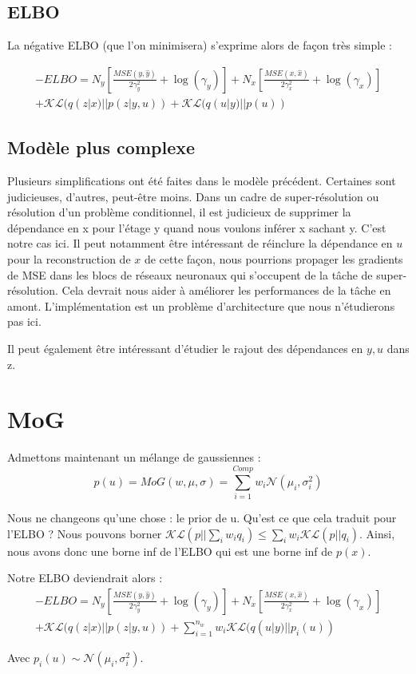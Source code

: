 \documentclass{article}
\begin{document}
\subsection{ELBO}
La négative ELBO (que l'on minimisera) s'exprime alors de façon très simple :

\begin{multline}
    - ELBO = N_y\left[\frac{MSE(y,\hat{y})}{2\gamma_y^2} + \log(\gamma_y)\right] + N_x\left[\frac{MSE(x,\hat{x})}{2\gamma_x^2} + \log(\gamma_x)\right]\\ + \mathcal{KL}(q(z|x)||p(z|y,u)) + \mathcal{KL}(q(u|y)||p(u)) 
\end{multline}

\subsection{Modèle plus complexe}
Plusieurs simplifications ont été faites dans le modèle précédent. Certaines sont judicieuses, d'autres, peut-être moins. Dans un cadre de super-résolution ou résolution d'un problème conditionnel, il est judicieux de supprimer la dépendance en x pour l'étage y quand nous voulons inférer x sachant y. C'est notre cas ici. Il peut notamment être intéressant de réinclure la dépendance en $u$ pour la reconstruction de $x$ de cette façon, nous pourrions propager les gradients de MSE dans les blocs de réseaux neuronaux qui s'occupent de la tâche de super-résolution. Cela devrait nous aider à améliorer les performances de la tâche en amont. L'implémentation est un problème d'architecture que nous n'étudierons pas ici.

Il peut également être intéressant d'étudier le rajout des dépendances en $y,u$ dans z.

\section{MoG}

Admettons maintenant un mélange de gaussiennes :
\begin{equation}
    p(u) = MoG(w, \mu, \sigma) = \sum_{i=1}^{Comp} w_i \mathcal{N}(\mu_i,\sigma_i^2)
\end{equation}

Nous ne changeons qu'une chose : le prior de u.
Qu'est ce que cela traduit pour l'ELBO ? 
Nous pouvons borner $\mathcal{KL}(p||\sum_i w_i q_i) \leq \sum_i w_i \mathcal{KL}(p||q_i)$. Ainsi, nous avons donc une borne inf de l'ELBO qui est une borne inf de $p(x)$.

Notre ELBO deviendrait alors :
\begin{multline}
    - ELBO = N_y\left[\frac{MSE(y,\hat{y})}{2\gamma_y^2} + \log(\gamma_y)\right] + N_x\left[\frac{MSE(x,\hat{x})}{2\gamma_x^2} + \log(\gamma_x)\right]\\ + \mathcal{KL}(q(z|x)||p(z|y,u)) + \sum_{i=1}^{n_w}w_i\mathcal{KL}(q(u|y)||p_i(u)) 
\end{multline}

Avec $p_i(u) \sim \mathcal{N}(\mu_i,\sigma_i^2)$.
\end{document}
